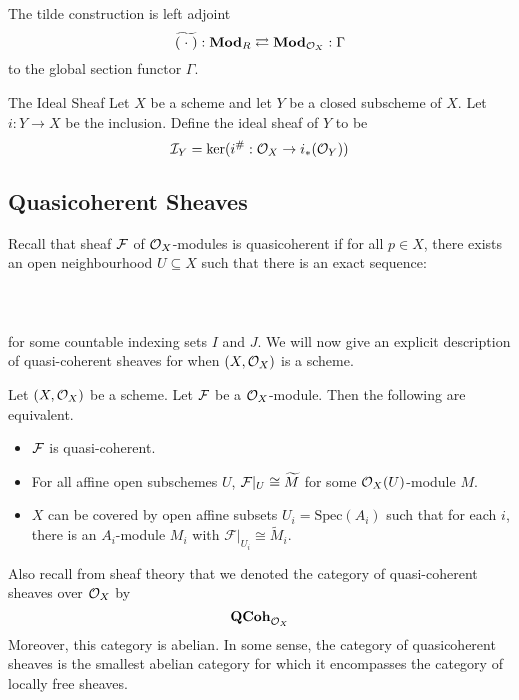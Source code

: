 \documentclass[a4paper]{article}
\begin{document}
\begin{thm}{}{} The tilde construction is left adjoint $$\widetilde{(\;\cdot\;)}:\bold{Mod}_R\rightleftarrows\bold{Mod}_{\mathcal{O}_X}:\Gamma$$ to the global section functor $\Gamma$. 
\end{thm}

\begin{defn}{The Ideal Sheaf}{} Let $X$ be a scheme and let $Y$ be a closed subscheme of $X$. Let $i:Y\to X$ be the inclusion. Define the ideal sheaf of $Y$ to be $$\mathcal{I}_Y=\ker(i^\#:\mathcal{O}_X\to i_\ast(\mathcal{O}_Y))$$ 
\end{defn}

\subsection{Quasicoherent Sheaves}
Recall that sheaf $\mathcal{F}$ of $\mathcal{O}_X$-modules is quasicoherent if for all $p\in X$, there exists an open neighbourhood $U\subseteq X$ such that there is an exact sequence: \\~\\
\\~\\
for some countable indexing sets $I$ and $J$. We will now give an explicit description of quasi-coherent sheaves for when $(X,\mathcal{O}_X)$ is a scheme. 

\begin{thm}{}{} Let $(X,\mathcal{O}_X)$ be a scheme. Let $\mathcal{F}$ be a $\mathcal{O}_X$-module. Then the following are equivalent. 
\begin{itemize}
\item $\mathcal{F}$ is quasi-coherent. 
\item For all affine open subschemes $U$, $\mathcal{F}|_U\cong\widetilde{M}$ for some $\mathcal{O}_X(U)$-module $M$. 
\item $X$ can be covered by open affine subsets $U_i=\text{Spec}(A_i)$ such that for each $i$, there is an $A_i$-module $M_i$ with $\mathcal{F}|_{U_i}\cong\widetilde{M}_i$. 
\end{itemize}
\end{thm}

Also recall from sheaf theory that we denoted the category of quasi-coherent sheaves over $\mathcal{O}_X$ by $$\bold{QCoh}_{\mathcal{O}_X}$$ Moreover, this category is abelian. In some sense, the category of quasicoherent sheaves is the smallest abelian category for which it encompasses the category of locally free sheaves. \\~\\
\end{document}
